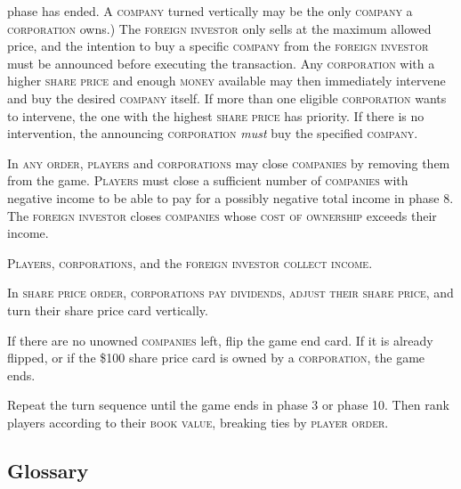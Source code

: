 \documentclass[8pt]{extarticle}
\newcounter{itemcounter}
\newenvironment{my_enumerate}
{\begin{list}{\arabic{itemcounter}.}
  {\usecounter{itemcounter}\leftmargin=1.8em}
  \setlength{\itemsep}{1pt}
  \setlength{\parskip}{0pt}
  \setlength{\parsep}{0pt}
}
{\end{list}}
\begin{document}
\begin{small}
\begin{multicols}{2}
{\begin{my_enumerate}
  phase has ended. A \textsc{company} turned vertically may be the
  only \textsc{company} a \textsc{corporation} owns.) The
  \textsc{foreign investor} only sells at the maximum allowed price,
  and the intention to buy a specific \textsc{company} from the
  \textsc{foreign investor} must be announced before executing the
  transaction. Any \textsc{corporation} with a higher \textsc{share
    price} and enough \textsc{money} available may then immediately
  intervene and buy the desired \textsc{company} itself. If more than
  one eligible \textsc{corporation} wants to intervene, the one with
  the highest \textsc{share price} has priority. If there is no
  intervention, the announcing \textsc{corporation} \emph{must} buy
  the specified \textsc{company}.
\item In \textsc{any order}, \textsc{players} and
  \textsc{corporations} may close \textsc{companies} by removing them
  from the game. \textsc{Players} must close a sufficient number of
  \textsc{companies} with negative income to be able to pay for a
  possibly negative total income in phase 8. The \textsc{foreign investor}
  closes \textsc{companies} whose \textsc{cost of ownership} exceeds
  their income.
\item \textsc{Players}, \textsc{corporations}, and the \textsc{foreign
    investor} \textsc{collect income}.
\item In \textsc{share price order}, \textsc{corporations} \textsc{pay
    dividends}, \textsc{adjust their share price}, and turn their
  share price card vertically.
\item If there are no unowned \textsc{companies} left, flip the game
  end card. If it is already flipped, or if the \$100 share price card
  is owned by a \textsc{corporation}, the game ends.
\end{my_enumerate}

Repeat the turn sequence until the game ends in phase 3 or phase
10. Then rank players according to their \textsc{book value},
breaking ties by \textsc{player order}.

\subsection*{Glossary}

}
\end{multicols}
\end{small}
\end{document}
